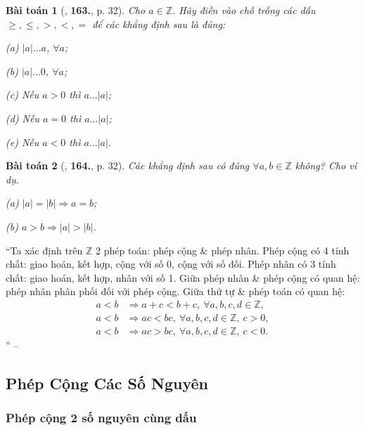 \documentclass{article}
\numberwithin{equation}{section}
\newtheorem{baitoan}{Bài toán}[section]
\begin{document}
\begin{baitoan}[\cite{Binh_Toan_6_tap_1}, \textbf{163.}, p. 32]
	Cho $a\in\mathbb{Z}$. Hãy điền vào chỗ trống các dấu $\ge,\le,>,<,=$ để các khẳng định sau là đúng:
	\begin{enumerate*}
		\item[(a)] $|a|\ldots a$, $\forall a$;
		\item[(b)] $|a|\ldots 0$, $\forall a$;
		\item[(c)] Nếu $a > 0$ thì $a\ldots|a|$;
		\item[(d)] Nếu $a = 0$ thì $a\ldots|a|$;
		\item[(e)] Nếu $a < 0$ thì $a\ldots|a|$.
	\end{enumerate*}
\end{baitoan}

\begin{baitoan}[\cite{Binh_Toan_6_tap_1}, \textbf{164.}, p. 32]
	Các khẳng định sau có đúng $\forall a,b\in\mathbb{Z}$ không? Cho ví dụ.
	\begin{enumerate*}
		\item[(a)] $|a| = |b|\Rightarrow a = b$;
		\item[(b)] $a > b\Rightarrow|a| > |b|$.
	\end{enumerate*}
\end{baitoan}


``Ta xác định trên $\mathbb{Z}$ 2 phép toán: phép cộng \& phép nhân. Phép cộng có 4 tính chất: giao hoán, kết hợp, cộng với số 0, cộng với số đối. Phép nhân có 3 tính chất: giao hoán, kết hợp, nhân với số 1. Giữa phép nhân \& phép cộng có quan hệ: phép nhân phân phối đối với phép cộng. Giữa thứ tự \& phép toán có quan hệ:
\begin{align*}
	a < b&\Rightarrow a + c < b + c,\ \forall a,b,c,d\in\mathbb{Z},\\
	a < b&\Rightarrow ac < bc,\ \forall a,b,c,d\in\mathbb{Z},\ c > 0,\\
	a < b&\Rightarrow ac > bc,\ \forall a,b,c,d\in\mathbb{Z},\ c < 0.
\end{align*}
'' -- \cite[p. 32]{Binh_Toan_6_tap_1}

\subsection{Phép Cộng Các Số Nguyên}

\subsubsection{Phép cộng 2 số nguyên cùng dấu}
\end{document}
